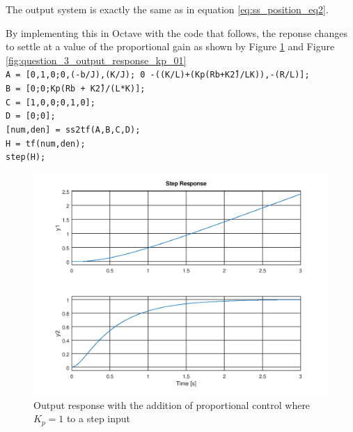 \documentclass[a4paper, 12pt]{article}
\begin{document}
The output system is exactly the same as in equation \eqref{eq:ss_position_eq2}.

By implementing this in Octave with the code that follows, the reponse changes to settle at a value of the proportional gain as shown by Figure \ref{fig:question_3_output_response_kp_1} and Figure \ref{fig:question_3_output_response_kp_01}\\
\noindent
\texttt{A = [0,1,0;0,(-b/J),(K/J); 0 -((K/L)+(Kp\*(R\*b+K\^2)/L\*K)),-(R/L)];}\\
\texttt{B = [0;0;Kp\*(R\*b + K\^2)/(L*K)];}\\
\texttt{C = [1,0,0;0,1,0];}\\
\texttt{D = [0;0];}\\
\texttt{[num,den] = ss2tf(A,B,C,D);}\\
\texttt{H = tf(num,den);}\\
\texttt{step(H);}\\

\begin{figure}[H]
	\centering
	\includegraphics[width=\textwidth]{Images/question_3_output_response_kp_1.png}
	\caption{Output response with the addition of proportional control where $K_p = 1$ to a step input}
	\label{fig:question_3_output_response_kp_1}
\end{figure}
\end{document}
